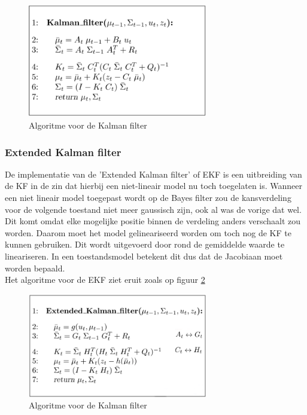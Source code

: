 \documentclass{book}
\begin{document}
\begin{figure}[h!]
	\centering
	\includegraphics[width = 0.7\textwidth]{Kalman_Algoritme}
	\caption{Algoritme voor de Kalman filter \cite{Proballistic}}
	\label{kalman}
\end{figure}

\subsubsection{Extended Kalman filter}
De implementatie van de 'Extended Kalman filter' of EKF is een uitbreiding van de KF in de zin dat hierbij een niet-lineair model nu toch toegelaten is. Wanneer een niet lineair model toegepast wordt op de Bayes filter zou de kansverdeling voor de volgende toestand niet meer gaussisch zijn, ook al was de vorige dat wel. Dit komt omdat elke mogelijke positie binnen de verdeling anders verschaalt zou worden. Daarom moet het model gelineariseerd worden om toch nog de KF te kunnen gebruiken. Dit wordt uitgevoerd door rond de gemiddelde waarde te lineariseren. In een toestandsmodel betekent dit dus dat de Jacobiaan moet worden bepaald. \cite{controltheory}\\
Het algoritme voor de EKF ziet eruit zoals op figuur \ref{extkal}

\begin{figure}[h!]
	\centering
	\includegraphics[width = 0.7\textwidth]{ExtendedKalman}
	\caption{Algoritme voor de Kalman filter \cite{Proballistic}}
	\label{extkal}
\end{figure}
\end{document}
